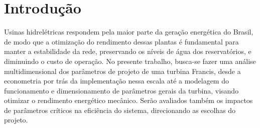  \chapter{Introdução}\label{chp:intro}

Usinas hidrelétricas respondem pela maior parte da geração energética do Brasil, de modo que a otimização do rendimento dessas plantas é fundamental para manter a estabilidade da rede, preservando os níveis de água dos reservatórios, e diminuindo o custo de operação.
No presente trabalho, busca-se fazer uma análise multidimensional dos parâmetros de projeto de uma turbina Francis, desde a econometria por trás da implementação nessa escala até a modelagem do funcionamento e dimensionamento de parâmetros gerais da turbina, visando otimizar o rendimento energético mecânico.
Serão avaliados também os impactos de parâmetros críticos na eficiência do sistema, direcionando as escolhas do projeto.